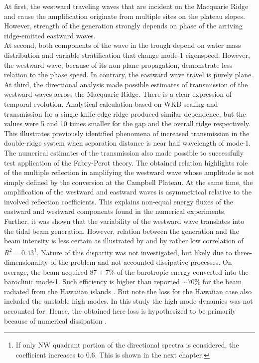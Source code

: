 \documentclass[12pt]{article}
\begin{document}
At first, the westward traveling waves that are incident on the 
Macquarie Ridge and cause the amplification originate from multiple sites on the plateau slopes. 
However, strength of the generation strongly depends on phase of the arriving ridge-emitted 
eastward waves.\\

At second, both components of the wave in the trough depend 
on water mass distribution and variable stratification that change mode-1 eigenspeed. However, the 
westward wave, because of its non plane propagation, demonstrate less relation to the phase speed. 
In contrary, the eastward wave travel is purely plane.\\

At third, the directional analysis made possible estimates of transmission of the westward waves 
across the Macquarie Ridge. There is a clear expression of temporal evolution. Analytical 
calculation based on WKB-scaling and transmission for a single knife-edge ridge produced similar 
dependence, but the values were 5 and 10 times smaller for the gap and the overall ridge 
respectively. This illustrates previously identified phenomena of increased transmission in the 
double-ridge system when separation distance is near half wavelength of mode-1. The numerical 
estimates of the transmission also made possible to successfully test application of the 
Fabry-Perot theory. The obtained relation highlights role of the 
multiple reflection in amplifying the westward wave whose amplitude is not simply defined by the 
conversion at the Campbell Plateau. At the same time, the amplification of the westward and 
eastward waves is asymmetrical relative to the involved reflection coefficients. This explains 
non-equal energy fluxes of the eastward and westward components found in the numerical 
experiments.\\

Further, it was shown that the variability of the westward wave translates into the tidal beam 
generation. However, relation between the generation and the beam intensity is less certain as 
illustrated by  and by rather low correlation of $R^2 = 
0.43$\footnote{If only NW quadrant portion of the directional spectra is considered, the 
coefficient increases to 0.6. This is shown in the next chapter.}. Nature of this disparity was not 
investigated, but likely due to three-dimensionality of the problem and not accounted dissipative 
processes. On average, the beam acquired $87 \pm 7\%$ of the barotropic energy converted into the 
baroclinic mode-1. Such efficiency is higher than reported $\sim 70\%$ for the beam radiated from 
the Hawaiian islands \citep{carter2008energetics}. But note the loss for the Hawaiian case 
also included the unstable high modes. In this study the high mode dynamics was not accounted 
for. Hence, the obtained here loss is hypothesized to be primarily because of numerical dissipation 
\citep{di2006numerical}.\\
\end{document}
